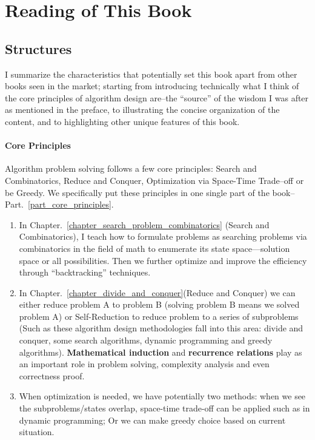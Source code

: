 \documentclass[../main.tex]{subfiles}
\begin{document}
\chapter{Reading of This Book}
\section{Structures}
I summarize the characteristics that potentially set this book apart from other books seen in the market; starting from introducing technically what I think of the core principles of algorithm design are--the ``source'' of the wisdom I was after as mentioned in the preface, to illustrating the concise organization of the content, and to highlighting other unique features of this book. 
\subsubsection{Core Principles}
Algorithm problem solving follows a few core principles: Search and Combinatorics, Reduce and Conquer, Optimization via Space-Time Trade--off or be Greedy. We specifically put these principles in one single part of the book--Part.~\ref{part_core_principles}.
\begin{enumerate}
    \item In Chapter.~\ref{chapter_search_problem_combinatorics} (Search and Combinatorics), I teach how to formulate problems as searching problems via combinatorics in the field of math to enumerate its state space—solution space or all possibilities. Then we further optimize and improve the efficiency through ``backtracking'' techniques. 
\item In Chapter.~\ref{chapter_divide_and_conquer}(Reduce and Conquer) we can either reduce problem A to problem B (solving problem B means we solved problem A)  or Self-Reduction to reduce problem to a series of subproblems (Such as these algorithm design methodologies fall into this area:  divide and conquer, some search algorithms, dynamic programming and greedy algorithms). \textbf{Mathematical induction} and \textbf{recurrence relations} play as an important role in  problem solving, complexity analysis and even correctness proof.  
\item When optimization is needed, we have potentially two methods: 
when we see the subproblems/states overlap, space-time trade-off can be applied such as in dynamic programming;
Or we can make greedy choice based on current situation. 
\end{enumerate}
\end{document}
